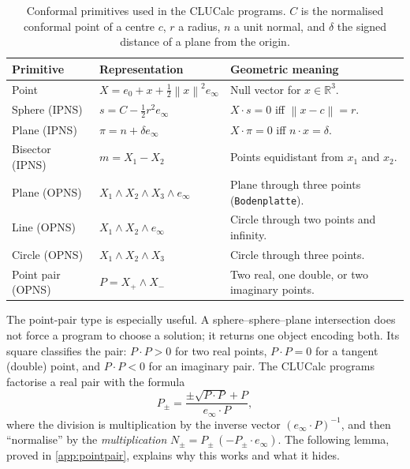 \documentclass[11pt,a4paper]{article}
\theoremstyle{plain}
\theoremstyle{definition}
\theoremstyle{remark}
\newcommand{\R}{\mathbb{R}}
\newcommand{\einf}{e_{\infty}}
\newcommand{\ezero}{e_{0}}
\newcommand{\norm}[1]{\left\lVert#1\right\rVert}
\begin{document}
\begin{table}[H]
  \centering
  \caption[Conformal primitives]{Conformal primitives used in the CLUCalc programs. $C$ is the
  normalised conformal point of a centre $c$, $r$ a radius, $n$ a unit normal,
  and $\delta$ the signed distance of a plane from the origin.}
  \label{tab:cga-primitives}
  \small
  \begin{tabularx}{\textwidth}{@{}>{\raggedright\arraybackslash}p{27mm}p{44mm}Y@{}}
    \toprule
    Primitive & Representation & Geometric meaning \\
    \midrule
    Point & $X=\ezero+x+\tfrac12\norm{x}^2\einf$ & Null vector for $x\in\R^3$. \\
    Sphere (IPNS) & $s=C-\tfrac12r^2\einf$ & $X\cdot s=0$ iff $\norm{x-c}=r$. \\
    Plane (IPNS) & $\pi=n+\delta\einf$ & $X\cdot\pi=0$ iff $n\cdot x=\delta$. \\
    Bisector (IPNS) & $m=X_1-X_2$ & Points equidistant from $x_1$ and $x_2$. \\
    Plane (OPNS) & $X_1\wedge X_2\wedge X_3\wedge\einf$ & Plane through three points (\texttt{Bodenplatte}). \\
    Line (OPNS) & $X_1\wedge X_2\wedge\einf$ & Circle through two points and infinity. \\
    Circle (OPNS) & $X_1\wedge X_2\wedge X_3$ & Circle through three points. \\
    Point pair (OPNS) & $P=X_+\wedge X_-$ & Two real, one double, or two imaginary points. \\
    \bottomrule
  \end{tabularx}
\end{table}

The point-pair type is especially useful. A sphere--sphere--plane intersection
does not force a program to choose a solution; it returns one object encoding
both. Its square classifies the pair: $P\cdot P>0$ for two real points,
$P\cdot P=0$ for a tangent (double) point, and $P\cdot P<0$ for an imaginary
pair. The CLUCalc programs factorise a real pair with the formula
\begin{equation}
  P_{\pm}=\frac{\pm\sqrt{P\cdot P}+P}{\einf\cdot P},
  \label{eq:pointpair-formula}
\end{equation}
where the division is multiplication by the inverse vector
$(\einf\cdot P)^{-1}$, and then ``normalise'' by the \emph{multiplication}
$N_\pm=P_\pm\,(-P_\pm\cdot\einf)$. The following lemma, proved in
\cref{app:pointpair}, explains why this works and what it hides.
\end{document}
